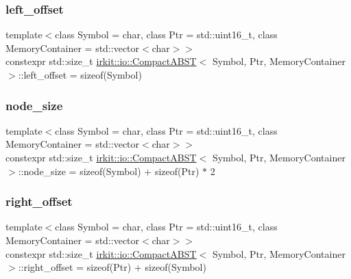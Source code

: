 \subsubsection{\texorpdfstring{left\+\_\+offset}{left\_offset}}
{\footnotesize\ttfamily template$<$class Symbol = char, class Ptr = std\+::uint16\+\_\+t, class Memory\+Container = std\+::vector$<$char$>$$>$ \\
constexpr std\+::size\+\_\+t \mbox{\hyperlink{classirkit_1_1io_1_1CompactABST}{irkit\+::io\+::\+Compact\+A\+B\+ST}}$<$ Symbol, Ptr, Memory\+Container $>$\+::left\+\_\+offset = sizeof(Symbol)\hspace{0.3cm}{\ttfamily [static]}}

\mbox{\label{classirkit_1_1io_1_1CompactABST_ada82da5e8d33fc09b71a0610d14ddaef}} 
\subsubsection{\texorpdfstring{node\+\_\+size}{node\_size}}
{\footnotesize\ttfamily template$<$class Symbol = char, class Ptr = std\+::uint16\+\_\+t, class Memory\+Container = std\+::vector$<$char$>$$>$ \\
constexpr std\+::size\+\_\+t \mbox{\hyperlink{classirkit_1_1io_1_1CompactABST}{irkit\+::io\+::\+Compact\+A\+B\+ST}}$<$ Symbol, Ptr, Memory\+Container $>$\+::node\+\_\+size = sizeof(Symbol) + sizeof(Ptr) $\ast$ 2\hspace{0.3cm}{\ttfamily [static]}}

\mbox{\label{classirkit_1_1io_1_1CompactABST_a924136dbb9bc8ff411804c2124ebd508}} 
\subsubsection{\texorpdfstring{right\+\_\+offset}{right\_offset}}
{\footnotesize\ttfamily template$<$class Symbol = char, class Ptr = std\+::uint16\+\_\+t, class Memory\+Container = std\+::vector$<$char$>$$>$ \\
constexpr std\+::size\+\_\+t \mbox{\hyperlink{classirkit_1_1io_1_1CompactABST}{irkit\+::io\+::\+Compact\+A\+B\+ST}}$<$ Symbol, Ptr, Memory\+Container $>$\+::right\+\_\+offset = sizeof(Ptr) + sizeof(Symbol)\hspace{0.3cm}{\ttfamily [static]}}

